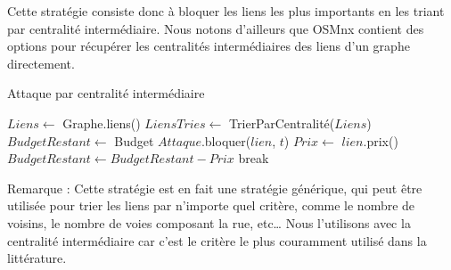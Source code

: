 Cette stratégie consiste donc à bloquer les liens les plus importants en les triant par centralité intermédiaire.
Nous notons d'ailleurs que OSMnx contient des options pour récupérer les centralités intermédiaires des liens d'un graphe directement.
\begin{algorithm}[H]
\caption{Attaque par centralité intermédiaire}
\begin{algorithmic}
\State $Liens \gets$ Graphe.liens()
\State $LiensTries \gets$ TrierParCentralité($Liens$)
    \State $BudgetRestant \gets$ Budget
        \State $Attaque$.bloquer($lien$, $t$)
        \State $Prix \gets$ $lien$.prix()
        \State $BudgetRestant \gets BudgetRestant - Prix$
            \State break
        \EndIf
    \EndFor
\EndFor
\end{algorithmic}
\end{algorithm}

Remarque : Cette stratégie est en fait une stratégie générique, qui peut être utilisée pour trier les liens par n'importe quel critère, comme le nombre de voisins, le nombre de voies composant la rue, etc\dots
Nous l'utilisons avec la centralité intermédiaire car c'est le critère le plus couramment utilisé dans la littérature.